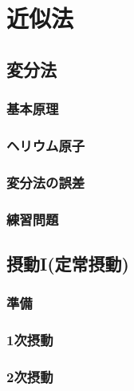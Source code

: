 \documentclass{report}
\begin{document}
  
  \maketitle
  \tableofcontents
  \chapter{近似法}
    \section{変分法}
      
      \subsection{基本原理}
        
      \subsection{ヘリウム原子}
        
      \subsection{変分法の誤差}
        
      \subsection{練習問題}
        
    \section{摂動I(定常摂動)}
      
      \subsection{準備}
        
      \subsection{1次摂動}
        
      \subsection{2次摂動}
        
\end{document}
